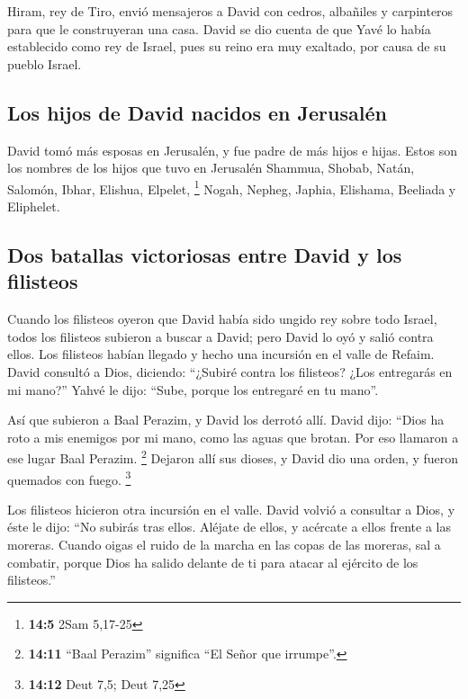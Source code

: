 \begin{paracol}{2}
 Hiram, rey de Tiro, envió mensajeros a David con cedros,
albañiles y carpinteros para que le construyeran una casa.
 David se dio cuenta de que Yavé lo había establecido como
rey de Israel, pues su reino era muy exaltado, por causa de su pueblo
Israel.

\hypertarget{los-hijos-de-david-nacidos-en-jerusaluxe9n}{%
\subsection{Los hijos de David nacidos en
Jerusalén}\label{los-hijos-de-david-nacidos-en-jerusaluxe9n}}

 David tomó más esposas en Jerusalén, y fue padre de más
hijos e hijas.  Estos son los nombres de los hijos que
tuvo en Jerusalén Shammua, Shobab, Natán, Salomón,  Ibhar,
Elishua, Elpelet, \footnote{\textbf{14:5} 2Sam 5,17-25} 
Nogah, Nepheg, Japhia,  Elishama, Beeliada y Eliphelet.

\hypertarget{dos-batallas-victoriosas-entre-david-y-los-filisteos}{%
\subsection{Dos batallas victoriosas entre David y los
filisteos}\label{dos-batallas-victoriosas-entre-david-y-los-filisteos}}

 Cuando los filisteos oyeron que David había sido ungido
rey sobre todo Israel, todos los filisteos subieron a buscar a David;
pero David lo oyó y salió contra ellos.  Los filisteos
habían llegado y hecho una incursión en el valle de Refaim.
 David consultó a Dios, diciendo: ``¿Subiré contra los
filisteos? ¿Los entregarás en mi mano?'' Yahvé le dijo: ``Sube, porque
los entregaré en tu mano''.

 Así que subieron a Baal Perazim, y David los derrotó
allí. David dijo: ``Dios ha roto a mis enemigos por mi mano, como las
aguas que brotan. Por eso llamaron a ese lugar Baal Perazim. \footnote{\textbf{14:11}
  ``Baal Perazim'' significa ``El Señor que irrumpe''.} 
Dejaron allí sus dioses, y David dio una orden, y fueron quemados con
fuego. \footnote{\textbf{14:12} Deut 7,5; Deut 7,25}

 Los filisteos hicieron otra incursión en el valle.
 David volvió a consultar a Dios, y éste le dijo: ``No
subirás tras ellos. Aléjate de ellos, y acércate a ellos frente a las
moreras.  Cuando oigas el ruido de la marcha en las copas
de las moreras, sal a combatir, porque Dios ha salido delante de ti para
atacar al ejército de los filisteos.''


\end{paracol}
